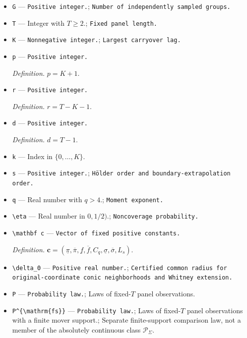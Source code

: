 \documentclass{article}
\begin{document}
\begin{itemize}
  \item \texttt{G} --- \texttt{Positive integer.}; \texttt{Number of independently sampled groups.}
  \item \texttt{T} --- Integer with \(T\ge 2\).; \texttt{Fixed panel length.}
  \item \texttt{K} --- \texttt{Nonnegative integer.}; \texttt{Largest carryover lag.}
  \item \texttt{p} --- \texttt{Positive integer.}
  \par\smallskip\noindent\emph{Definition.} \(p=K+1\).
  \item \texttt{r} --- \texttt{Positive integer.}
  \par\smallskip\noindent\emph{Definition.} \(r=T-K-1\).
  \item \texttt{d} --- \texttt{Positive integer.}
  \par\smallskip\noindent\emph{Definition.} \(d=T-1\).
  \item \texttt{k} --- Index in \(\{0,\ldots,K\}\).
  \item \texttt{s} --- \texttt{Positive integer.}; \texttt{Hölder order and boundary-\allowbreak{}extrapolation order.}
  \item \texttt{q} --- Real number with \(q>4\).; \texttt{Moment exponent.}
  \item \texttt{\textbackslash{}\allowbreak{}eta} --- Real number in \(0,1/2)\).; \texttt{Noncoverage probability.}
  \item \texttt{\textbackslash{}\allowbreak{}mathbf c} --- \texttt{Vector of fixed positive constants.}
  \par\smallskip\noindent\emph{Definition.} \(\mathbf c=(\underline\pi,\overline\pi,\underline f,\overline f,C_q,\underline\sigma,\overline\sigma,L_s)\).
  \item \texttt{\textbackslash{}\allowbreak{}delta\_\allowbreak{}0} --- \texttt{Positive real number.}; \texttt{Certified common radius for original-\allowbreak{}coordinate conic neighborhoods and Whitney extension.}
  \item \texttt{P} --- \texttt{Probability law.}; Laws of fixed-\(T\) panel observations.
  \item \texttt{P\textasciicircum{}\{\textbackslash{}\allowbreak{}mathrm\{fs\}\allowbreak{}\}\allowbreak{}} --- \texttt{Probability law.}; Laws of fixed-\(T\) panel observations with a finite mover support.; Separate finite-support comparison law, not a member of the absolutely continuous class \(\mathcal P_\Sigma\).

\end{itemize}
\end{document}
